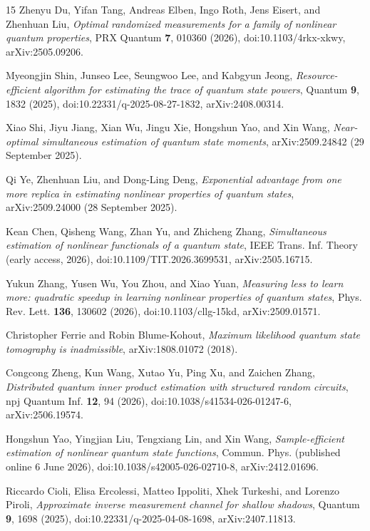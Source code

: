 \documentclass[a4paper,superscriptaddress,nofootinbib,onecolumn,nopdfoutputerror]{quantumarticle}
\begin{document}
\begin{thebibliography}{15}
Zhenyu Du, Yifan Tang, Andreas Elben, Ingo Roth, Jens Eisert, and Zhenhuan Liu,
\emph{Optimal randomized measurements for a family of nonlinear quantum properties},
PRX Quantum \textbf{7}, 010360 (2026), doi:10.1103/4rkx-xkwy, arXiv:2505.09206.

Myeongjin Shin, Junseo Lee, Seungwoo Lee, and Kabgyun Jeong,
\emph{Resource-efficient algorithm for estimating the trace of quantum state powers},
Quantum \textbf{9}, 1832 (2025), doi:10.22331/q-2025-08-27-1832, arXiv:2408.00314.

Xiao Shi, Jiyu Jiang, Xian Wu, Jingu Xie, Hongshun Yao, and Xin Wang,
\emph{Near-optimal simultaneous estimation of quantum state moments},
arXiv:2509.24842 (29 September 2025).

Qi Ye, Zhenhuan Liu, and Dong-Ling Deng,
\emph{Exponential advantage from one more replica in estimating nonlinear properties of quantum states},
arXiv:2509.24000 (28 September 2025).



Kean Chen, Qisheng Wang, Zhan Yu, and Zhicheng Zhang,
\emph{Simultaneous estimation of nonlinear functionals of a quantum state},
IEEE Trans. Inf. Theory (early access, 2026), doi:10.1109/TIT.2026.3699531, arXiv:2505.16715.

Yukun Zhang, Yusen Wu, You Zhou, and Xiao Yuan,
\emph{Measuring less to learn more: quadratic speedup in learning nonlinear properties of
quantum states}, Phys. Rev. Lett. \textbf{136}, 130602 (2026),
doi:10.1103/cllg-15kd, arXiv:2509.01571.

Christopher Ferrie and Robin Blume-Kohout,
\emph{Maximum likelihood quantum state tomography is inadmissible},
arXiv:1808.01072 (2018).

Congcong Zheng, Kun Wang, Xutao Yu, Ping Xu, and Zaichen Zhang,
\emph{Distributed quantum inner product estimation with structured random circuits},
npj Quantum Inf. \textbf{12}, 94 (2026), doi:10.1038/s41534-026-01247-6, arXiv:2506.19574.

Hongshun Yao, Yingjian Liu, Tengxiang Lin, and Xin Wang,
\emph{Sample-efficient estimation of nonlinear quantum state functions},
Commun. Phys. (published online 6 June 2026), doi:10.1038/s42005-026-02710-8, arXiv:2412.01696.

Riccardo Cioli, Elisa Ercolessi, Matteo Ippoliti, Xhek Turkeshi, and Lorenzo Piroli,
\emph{Approximate inverse measurement channel for shallow shadows},
Quantum \textbf{9}, 1698 (2025), doi:10.22331/q-2025-04-08-1698, arXiv:2407.11813.


\end{thebibliography}
\end{document}
